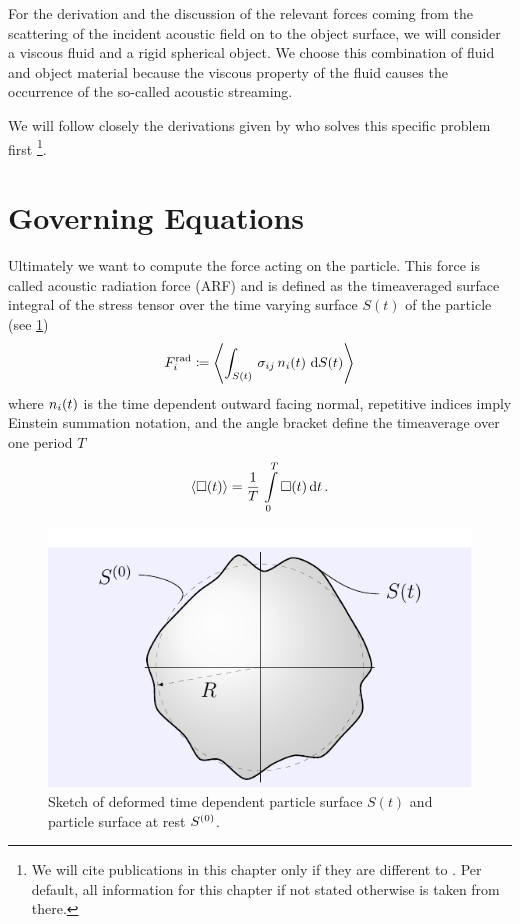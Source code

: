 For the derivation and the discussion of the relevant forces coming from the 
scattering of the incident acoustic field on to the object surface, we will 
consider a viscous fluid and a rigid spherical object. We choose this 
combination of fluid and object material because the viscous property of the 
fluid causes the occurrence of the so-called acoustic streaming.

We will follow closely the derivations given by  who 
solves this specific problem first \footnote{We will cite publications in this 
chapter only if they are different to . Per default, 
all information for this chapter if not stated otherwise is taken from there.}.

\section{Governing Equations}

Ultimately we want to compute the force acting on the particle. This force is 
called acoustic radiation force (ARF) and is defined as the timeaveraged 
surface integral of the stress tensor over the time varying surface $S(t)$ of 
the particle (see \cref{fig:TA-deformed_circle})
\begin{equation}
  F^{\mathrm{rad}}_{i} \coloneqq
  \left\langle \int_{S(t)}\,\sigma_{ij}\,n_{i}(t)\,\dd{S(t)} \right\rangle
  \label{eq:TA-def-rad}
\end{equation}
where $n_{i}(t)$ is the time dependent outward facing normal, repetitive 
indices imply Einstein summation notation, and the angle bracket define the 
timeaverage over one period $T$
\begin{equation}
  \left\langle \Box(t) \right\rangle = \frac{1}{T}\,\int\limits_{0}^{T}\Box(t)\dd{t}.
  \label{eq:TA-timeaverage}
\end{equation}

\begin{figure}[tbp]
  \centering
  \includegraphics[]{Plots/cache/deformed_circle.pdf}
  \caption{Sketch of deformed time dependent particle surface $S(t)$ and 
  particle surface at rest $S^{(0)}$.}
  \label{fig:TA-deformed_circle}
\end{figure}


